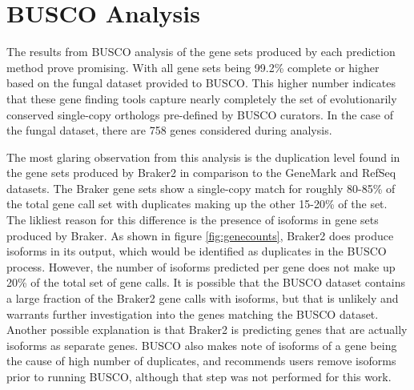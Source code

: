 \section{BUSCO Analysis}

The results from BUSCO analysis of the gene sets produced by each
prediction method prove promising. With all gene sets being 99.2\%
complete or higher based on the fungal dataset provided to BUSCO. This
higher number indicates that these gene finding tools capture nearly
completely the set of evolutionarily conserved single-copy orthologs
pre-defined by BUSCO curators. In the case of the fungal dataset,
there are 758 genes considered during analysis.

The most glaring observation from this analysis is the duplication
level found in the gene sets produced by Braker2 in comparison to the
GeneMark and RefSeq datasets. The Braker gene sets show a single-copy
match for roughly 80-85\% of the total gene call set with duplicates
making up the other 15-20\% of the set. The likliest reason for this
difference is the presence of isoforms in gene sets produced by
Braker. As shown in figure \ref{fig:genecounts}, Braker2 does produce
isoforms in its output, which would be identified as duplicates in
the BUSCO process. However, the number of isoforms predicted per gene
does not make up 20\% of the total set of gene calls. It is possible
that the BUSCO dataset contains a large fraction of the Braker2 gene
calls with isoforms, but that is unlikely and warrants further
investigation into the genes matching the BUSCO dataset.  Another
possible explanation is that Braker2 is predicting genes that are
actually isoforms as separate genes. BUSCO also makes note of isoforms
of a gene being the cause of high number of duplicates, and recommends
users remove isoforms prior to running BUSCO, although that step was
not performed for this work.



